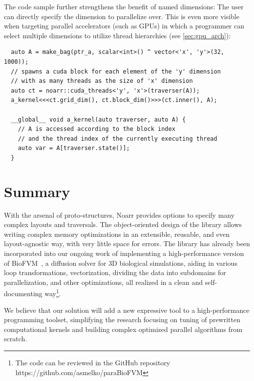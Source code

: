 The code sample further strengthens the benefit of named dimensions: The user can directly specify the dimension to parallelize over. This is even more visible when targeting parallel accelerators (such as GPUs) in which a programmer can select multiple dimensions to utilize thread hierarchies (see \cref{sec:gpu_arch}):

\begin{verbatim}
  auto A = make_bag(ptr_a, scalar<int>() ^ vector<'x', 'y'>(32, 1000));
  // spawns a cuda block for each element of the 'y' dimension
  // with as many threads as the size of 'x' dimension
  auto ct = noarr::cuda_threads<'y', 'x'>(traverser(A));
  a_kernel<<<ct.grid_dim(), ct.block_dim()>>>(ct.inner(), A);

  __global__ void a_kernel(auto traverser, auto A) {
    // A is accessed according to the block index
    // and the thread index of the currently executing thread
    auto var = A[traverser.state()];
  }
\end{verbatim}

\section{Summary}

With the arsenal of proto-structures, Noarr provides options to specify many complex layouts and traversals. The object-oriented design of the library allows writing complex memory optimizations in an extensible, reusable, and even layout-agnostic way, with very little space for errors. The library has already been incorporated into our ongoing work of implementing a high-performance version of BioFVM~\cite{ghaffarizadeh2016biofvm}, a diffusion solver for 3D biological simulations, aiding in various loop transformations, vectorization, dividing the data into subdomains for parallelization, and other optimizations, all realized in a clean and self-documenting way\footnote{The code can be reviewed in the GitHub repository https://github.com/asmelko/paraBioFVM}.

We believe that our solution will add a new expressive tool to a high-performance programming toolset, simplifying the research focusing on tuning of prewritten computational kernels and building complex optimized parallel algorithms from scratch.


